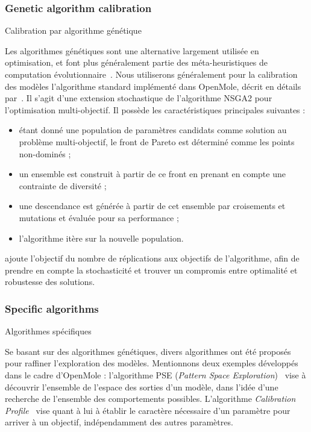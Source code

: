 \subsubsection*{Genetic algorithm calibration}{Calibration par algorithme génétique}

Les algorithmes génétiques sont une alternative largement utilisée en optimisation, et font plus généralement partie des méta-heuristiques de computation évolutionnaire~\cite{rey2015plateforme}. Nous utiliserons généralement pour la calibration des modèles l'algorithme standard implémenté dans OpenMole, décrit en détails par~\cite{pumain2017evaluation}. Il s'agit d'une extension stochastique de l'algorithme NSGA2 pour l'optimisation multi-objectif. Il possède les caractéristiques principales suivantes :
\begin{itemize}
	\item étant donné une population de paramètres candidats comme solution au problème multi-objectif, le front de Pareto est déterminé comme les points non-dominés ;
	\item un ensemble est construit à partir de ce front en prenant en compte une contrainte de diversité ;
	\item une descendance est générée à partir de cet ensemble par croisements et mutations et évaluée pour sa performance ;
	\item l'algorithme itère sur la nouvelle population.
\end{itemize}

\cite{pumain2017evaluation} ajoute l'objectif du nombre de réplications aux objectifs de l'algorithme, afin de prendre en compte la stochasticité et trouver un compromis entre optimalité et robustesse des solutions.


\subsubsection*{Specific algorithms}{Algorithmes spécifiques}

Se basant sur des algorithmes génétiques, divers algorithmes ont été proposés pour raffiner l'exploration des modèles. Mentionnons deux exemples développés dans le cadre d'OpenMole : l'algorithme PSE (\emph{Pattern Space Exploration})~\cite{10.1371/journal.pone.0138212} vise à découvrir l'ensemble de l'espace des sorties d'un modèle, dans l'idée d'une recherche de l'ensemble des comportements possibles. L'algorithme \emph{Calibration Profile}~\cite{reuillon2015} vise quant à lui à établir le caractère nécessaire d'un paramètre pour arriver à un objectif, indépendamment des autres paramètres.





\stars







